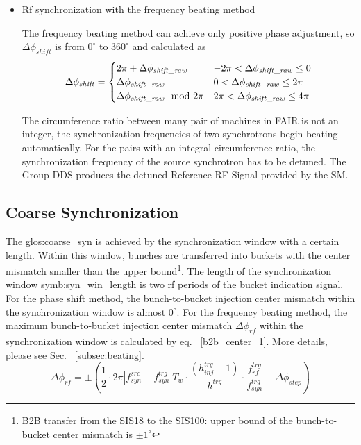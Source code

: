 \begin{itemize}
\item Rf synchronization with the frequency beating method

The frequency beating method can achieve only positive phase adjustment, so $\Delta \phi_\mathit{shift}$ is from $0^\circ$ to $360^\circ$ and calculated as
\begin{eqnarray}\Delta \phi_\mathit{shift}=
\begin{cases} 
2\pi+ \Delta \phi_\mathit{shift\_raw} & -2\pi<\Delta \phi_\mathit{shift\_raw}\le0 \cr

\Delta \phi_\mathit{shift\_raw} & 0<\Delta \phi_\mathit{shift\_raw}\le 2\pi \cr

\Delta \phi_\mathit{shift\_raw} \mod 2\pi &  2\pi<\Delta \phi_\mathit{shift\_raw}\le4\pi \cr

\end{cases}
\end{eqnarray}


The circumference ratio between many pair of machines in FAIR is not an integer, the synchronization frequencies of two synchrotrons begin beating automatically. For the pairs with an integral circumference ratio, the synchronization frequency of the source synchrotron has to be detuned. The Group DDS produces the detuned Reference RF Signal provided by the SM. 
\end{itemize}


\subsection{Coarse Synchronization}

The \gls{glos:coarse_syn} is achieved by the synchronization window with a certain length. Within this window, bunches are transferred into buckets with the center mismatch smaller than the upper bound\footnote{B2B transfer from the SIS18 to the SIS100: upper bound of the bunch-to-bucket center mismatch is $\pm1^\circ$}. The length of the synchronization window \gls{symb:syn_win_length} is two rf periods of the bucket indication signal. For the phase shift method, the bunch-to-bucket injection center mismatch within the synchronization window is almost $0^\circ$. For the frequency beating method, the maximum bunch-to-bucket injection center mismatch $\Delta \phi_\mathit{rf}$ within the synchronization window is calculated by eq. ~\ref{b2b_center_1}. More details, please see Sec. ~\ref{subsec:beating}.
\begin{equation}
\Delta \phi_\mathit{rf}=\pm (\frac{1}{2}\cdot 2\pi|f_{\mathit{syn}}^\mathit{src}-f_{\mathit{syn}}^\mathit{trg}|T_\mathit{w}\cdot \frac{(h^\mathit{trg}_\mathit{inj}-1)}{h^\mathit{trg}} \cdot  \frac{f_{\mathit{rf}}^\mathit{trg}}{f_{\mathit{syn}}^\mathit{trg}}+\Delta \phi_\mathit{step})
\label{b2b_center_1}
\end{equation}

